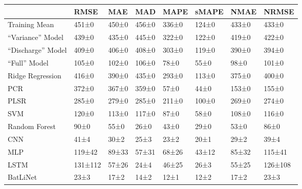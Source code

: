 \begin{tabular}{llllllll}
\toprule
 & RMSE & MAE & MAD & MAPE & sMAPE & NMAE & NRMSE \\
\midrule
Training Mean & 451±0 & 450±0 & 456±0 & 336±0 & 124±0 & 433±0 & 433±0 \\
``Variance'' Model & 439±0 & 435±0 & 445±0 & 322±0 & 122±0 & 419±0 & 422±0 \\
``Discharge'' Model & 409±0 & 406±0 & 408±0 & 303±0 & 119±0 & 390±0 & 394±0 \\
``Full'' Model & 105±0 & 102±0 & 106±0 & 78±0 & 55±0 & 98±0 & 101±0 \\
Ridge Regression & 416±0 & 390±0 & 435±0 & 293±0 & 113±0 & 375±0 & 400±0 \\
PCR & 372±0 & 367±0 & 359±0 & 57±0 & 44±0 & 153±0 & 155±0 \\
PLSR & 285±0 & 279±0 & 285±0 & 211±0 & 100±0 & 269±0 & 274±0 \\
SVM & 120±0 & 113±0 & 117±0 & 87±0 & 58±0 & 108±0 & 116±0 \\
Random Forest & 90±0 & 55±0 & 26±0 & 43±0 & 29±0 & 53±0 & 86±0 \\
CNN & 41±4 & 30±2 & 25±3 & 23±2 & 20±1 & 29±2 & 39±4 \\
MLP & 119±42 & 89±33 & 57±31 & 68±26 & 43±12 & 85±32 & 115±41 \\
LSTM & 131±112 & 57±26 & 24±4 & 46±25 & 26±3 & 55±25 & 126±108 \\
BatLiNet & 23±3 & 17±2 & 14±2 & 12±1 & 12±2 & 17±2 & 23±3 \\
\bottomrule
\end{tabular}

